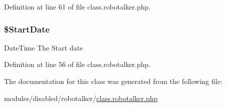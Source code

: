 Definition at line 61 of file class.\-robotalker.\-php.

\hypertarget{class_get_calls_request_a82e0539eeca49a1fbea42227a8f96d31}{
\subsubsection[{\$\-Start\-Date}]{\setlength{\rightskip}{0pt plus 5cm}\$Start\-Date}}\label{class_get_calls_request_a82e0539eeca49a1fbea42227a8f96d31}
Date\-Time The Start date 

Definition at line 56 of file class.\-robotalker.\-php.



The documentation for this class was generated from the following file\-:\begin{DoxyCompactItemize}
\item 
modules/disabled/robotalker/\hyperlink{class_8robotalker_8php}{class.\-robotalker.\-php}\end{DoxyCompactItemize}
